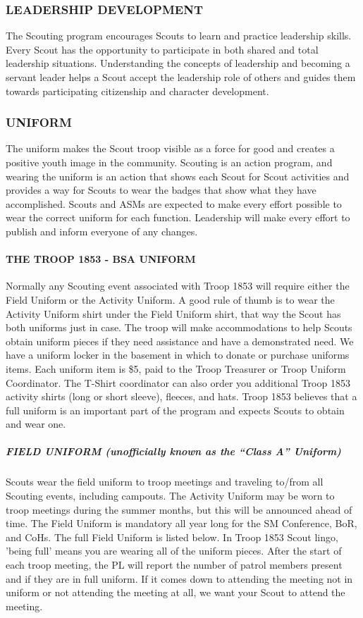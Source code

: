 \documentclass{ltxguide}
\begin{document}
\subsubsection{LEADERSHIP DEVELOPMENT}
The Scouting program encourages Scouts to learn and practice leadership skills. Every Scout has the opportunity to participate in both shared and total leadership situations. Understanding the concepts of leadership and becoming a servant leader helps a Scout accept the leadership role of others and guides them towards participating citizenship and character development.

\subsubsection{UNIFORM}
The uniform makes the Scout troop visible as a force for good and creates a positive youth image in the community. Scouting is an action program, and wearing the uniform is an action that shows each Scout for Scout activities and provides a way for Scouts to wear the badges that show what they have accomplished. Scouts and \acp{ASM} are expected to make every effort possible to wear the correct uniform for each function. Leadership will make every effort to publish and inform everyone of any changes. 

\paragraph{THE TROOP 1853 - \ac{BSA} UNIFORM}
Normally any Scouting event associated with Troop 1853 will require either the Field Uniform or the Activity Uniform. A good rule of thumb is to wear the Activity Uniform shirt under the Field Uniform shirt, that way the Scout has both uniforms just in case. The troop will make accommodations to help Scouts obtain uniform pieces if they need assistance and have a demonstrated need. We have a uniform locker in the basement in which to donate or purchase uniforms items. Each uniform item is \$5, paid to the Troop Treasurer or Troop Uniform Coordinator. The T-Shirt coordinator can also order you additional Troop 1853 activity shirts (long or short sleeve), fleeces, and hats. Troop 1853 believes that a full uniform is an important part of the program and expects Scouts to obtain and wear one.

\subparagraph{FIELD UNIFORM (unofficially known as the “Class A” Uniform)}
Scouts wear the field uniform to troop meetings and traveling to/from all Scouting events, including campouts. The Activity Uniform may be worn to troop meetings during the summer months, but this will be announced ahead of time. The Field Uniform is mandatory all year long for the \ac{SM} Conference, \ac{BoR}, and \acp{CoH}. The full Field Uniform is listed below. In Troop 1853 Scout lingo, 'being full' means you are wearing all of the uniform pieces. After the start of each troop meeting, the \ac{PL} will report the number of patrol members present and if they are in full uniform. If it comes down to attending the meeting not in uniform or not attending the meeting at all, we want your Scout to attend the meeting.
\end{document}
